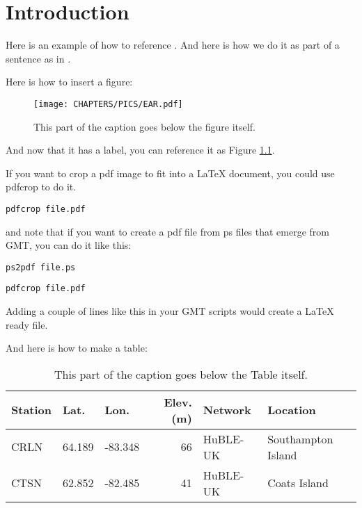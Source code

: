 \chapter{Introduction}
\label{intro}


Here is an example of how to reference \citep[e.g.,][]{lange2016devito}.  And here is how we do it as part of a sentence as in \citet{lange2016devito}.


Here is how to insert a figure:

\begin{figure}[!htbp]
\begin{center}
\texttt{[image: CHAPTERS/PICS/EAR.pdf]}
\end{center}
\caption[Here is a caption that goes in the list of figures]
{This part of the caption goes below the figure itself.}
\label{EAR}
\end{figure}

And now that it has a label, you can reference it as Figure \ref{EAR}.


If you want to crop a pdf image to fit into a LaTeX document, you could use  pdfcrop to do it.

\verb|pdfcrop file.pdf|

and note that if you want to create a pdf file from ps files that emerge from GMT, you can do it like this:

\verb|ps2pdf file.ps|

\verb|pdfcrop file.pdf|

Adding a couple of lines like this in your GMT scripts would create a LaTeX ready file.

And here is how to make a table:

\begin{table}
\caption[Here is a caption that goes in the list of Tables]
{This part of the caption goes below the Table itself.}
\begin{center}
\begin{tabular}{lllrll}
\hline
Station & Lat. & Lon. & Elev. (m) & Network & Location \\
\hline
CRLN & 64.189 & -83.348 & 66  & HuBLE-UK & Southampton Island 	\\
CTSN & 62.852 & -82.485 & 41  & HuBLE-UK & Coats Island 		\\
\hline
\end{tabular}
\end{center}
\label{some_data}
\end{table}
\newpage


